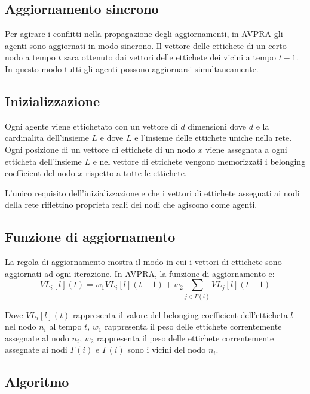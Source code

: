 \documentclass[a4paper,12pt]{report}
\begin{document}
		\subsection{Aggiornamento sincrono}
		Per agirare i conflitti nella propagazione degli aggiornamenti, in AVPRA gli agenti sono aggiornati in modo sincrono. Il vettore delle ettichete di un certo nodo a tempo $t$ sara ottenuto dai vettori delle ettichete dei vicini a tempo $t-1$. In questo modo tutti gli agenti possono aggiornarsi simultaneamente.
	
		\subsection{Inizializzazione}
		Ogni agente viene ettichetato con un vettore di $d$ dimensioni dove $d$ e la cardinalita dell'insieme $L$ e dove $L$ e l'insieme delle ettichete uniche nella rete. Ogni posizione di un vettore di ettichete di un nodo $x$ viene assegnata a ogni etticheta dell'insieme $L$ e nel vettore di ettichete vengono memorizzati i belonging coefficient del nodo $x$ rispetto a tutte le ettichete. 
		
		L'unico requisito dell'inizializzazione e che i vettori di ettichete assegnati ai nodi della rete riflettino proprieta reali dei nodi che agiscono come agenti. \cite{avpra}

		\subsection{Funzione di aggiornamento}
		La regola di aggiornamento mostra il modo in cui i vettori di ettichete sono aggiornati ad ogni iterazione. In AVPRA, la funzione di aggiornamento e:
		\begin{equation}
		VL_i [l] (t) = w_1 VL_i [l] (t-1) + w_2 \sum_{j \in \Gamma(i)} VL_j [l](t-1)
		\end{equation}

		Dove $VL_i[l](t)$ rappresenta il valore del belonging coefficient dell'etticheta $l$ nel nodo $n_i$ al tempo $t$, $w_1$ rappresenta il peso delle ettichete correntemente assegnate al nodo $n_i$, $w_2$ rappresenta il peso delle ettichete correntemente assegnate ai nodi $\Gamma(i)$ e $\Gamma(i)$ sono i vicini del nodo $n_i$. \cite{avpra}

		\subsection{Algoritmo}
\end{document}
